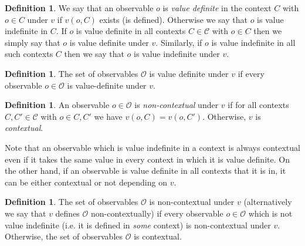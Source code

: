 \documentclass[11pt, a4paper]{article}
\theoremstyle{definition}
\newtheorem{Definition}[Theorem]{Definition}
\begin{document}
\begin{Definition}
	We say that an observable $o$ is \emph{value definite} in the context $C$ with $o\in C$ under $v$ if $v(o,C)$ exists (is defined). Otherwise we say that $o$ is value indefinite in $C$.
	If $o$ is value definite in all contexts $C\in \mathcal{C}$ with $o\in C$ then we simply say that $o$ is value definite under $v$.
	Similarly, if $o$ is value indefinite in all such contexts $C$ then we say that $o$ is value indefinite under $v$.\\
\end{Definition}
\begin{Definition}
	The set of observables $\mathcal{O}$ is value definite under $v$ if every observable $o\in\mathcal{O}$ is value-definite under $v$.\\%
\end{Definition}

\begin{Definition}
 	An observable $o\in \mathcal{O}$ is \emph{non-contextual} under $v$ if for all contexts $C,C' \in \mathcal{C}$ with $o\in C,C'$ we have $v(o,C)=v(o,C')$. Otherwise, $v$ is \emph{contextual}.
\end{Definition}
	Note that an observable which is value indefinite in a context is always contextual even if it takes the same value in every context in which it is value definite.
	On the other hand, if an observable is value definite in all contexts that it is in, it can be either contextual or not depending on $v$.\\

\begin{Definition}
	The set of observables $\mathcal{O}$ is non-contextual under $v$ (alternatively we say that $v$ defines $\mathcal{O}$ non-contextually) if every %
	observable $o\in\mathcal{O}$ which is not value indefinite (i.e. it is defined in \emph{some} context) is non-contextual under $v$.
	Otherwise, the set of observables $\mathcal{O}$ is contextual.
	\\
\end{Definition}
\end{document}
